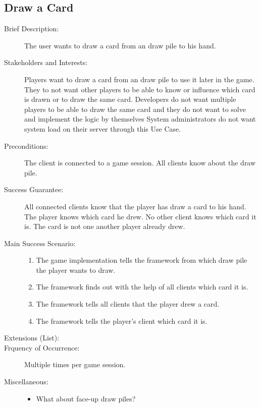 \subsection{Draw a Card}

\begin{description}
  \item[Brief Description:] The user wants to draw a card from an \gls{draw
  pile} to his \gls{hand}.
  \item[Stakeholders and Interests:] Players want to draw a card from an
  \gls{draw pile} to use it later in the game. They to not want other players
  to be able to know or influence which card is drawn or to draw the same card.
  Developers do not want multiple players to be able to draw the same card and
  they do not want to solve and implement the logic by themselves System
  administrators do not want system load on their server through this Use Case.
  \item[Preconditions:] The client is connected to a game session. All clients
  know about the \gls{draw pile}.
  \item[Success Guarantee:] All connected clients know that the player has draw
  a card to his hand. The player knows which card he drew. No other client knows
  which card it is. The card is not one another player already drew.
  \item[Main Success Scenario:] \hfill
  \begin{enumerate}
    \item \label{itm:drawcard_telldrawpile} The game implementation tells the
    framework from which \gls{draw pile} the player wants to draw.
    \item The framework finds out with the help of all clients which card it is.
    \item The framework tells all clients that the player drew a card.
    \item The framework tells the player's client which card it is.
  \end{enumerate}
  \item[Extensions (List):] \hfill
  \item[Frquency of Occurrence:] Multiple times per game session.
  \item[Miscellaneous:] \hfill
  \begin{itemize}
    \item What about \gls{face}-up \glspl{draw pile}?
  \end{itemize}
\end{description}
